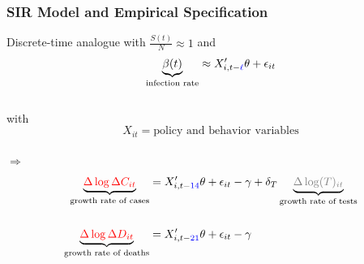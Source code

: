 \documentclass{beamer}
\newcommand{\Blue}{\color{blue}}
\def\wcolor{\color{gray}}
\def\ycolor{\color{red}}
\begin{document}



\begin{frame}
  \frametitle{SIR Model and Empirical Specification}\vspace{-0.05cm}
   
       Discrete-time analogue  with $\frac{S(t)}{N} \approx 1$ and\\ \smallskip
       $$\underbrace{ \beta(t) }_{\text{infection rate}} \approx   X_{i,t-{\Blue \ell}}'  \theta + \epsilon_{it}$$    \\ \smallskip
       with\smallskip
$$
X_{it} = \text{policy and behavior variables}
$$ \\\smallskip
$\Rightarrow$\medskip   
   \begin{align*}            
\underbrace{ {\ycolor \Delta \log \Delta C_{it}} }_{\text{growth rate of cases}}&   =  X_{i,t-{\Blue 14}}' \theta + \epsilon_{it} - \gamma+\delta_T \underbrace{ {\wcolor \Delta
      \log(T)_{it}}}_{\text{growth rate of tests}}\\
      &\quad \\
\underbrace{ {\ycolor \Delta \log \Delta D_{it}}  }_{\text{growth rate of deaths}}  & = X_{i,t-{\Blue 21}}' \theta + \epsilon_{it} - \gamma\smallskip 
                 \end{align*}      

\end{frame}



 
\end{document}
